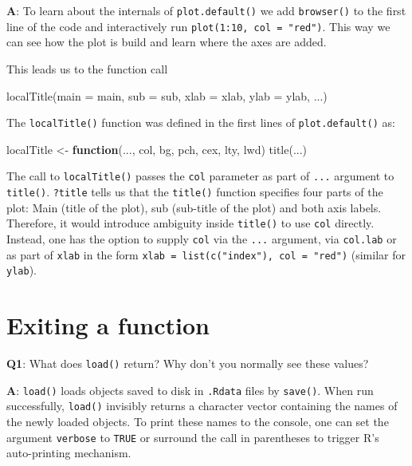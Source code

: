\documentclass[
]{krantz}
\makeatletter
\newenvironment{Shaded}{\begin{snugshade}}{\end{snugshade}}
\newcommand{\ControlFlowTok}[1]{\textcolor[rgb]{0.13,0.29,0.53}{\textbf{#1}}}
\newcommand{\DataTypeTok}[1]{\textcolor[rgb]{0.13,0.29,0.53}{#1}}
\newcommand{\KeywordTok}[1]{\textcolor[rgb]{0.13,0.29,0.53}{\textbf{#1}}}
\newcommand{\NormalTok}[1]{#1}
\newcommand{\StringTok}[1]{\textcolor[rgb]{0.31,0.60,0.02}{#1}}
\newenvironment{kframe}{%
\medskip{}
\setlength{\fboxsep}{.8em}
 \def\at@end@of@kframe{}%
 \ifinner\ifhmode%
  \def\at@end@of@kframe{\end{minipage}}%
  \begin{minipage}{\columnwidth}%
 \fi\fi%
 \def\FrameCommand##1{\hskip\@totalleftmargin \hskip-\fboxsep
 \colorbox{shadecolor}{##1}\hskip-\fboxsep
     \hskip-\linewidth \hskip-\@totalleftmargin \hskip\columnwidth}%
 \MakeFramed {\advance\hsize-\width
   \@totalleftmargin\z@ \linewidth\hsize
   \@setminipage}}%
 {\par\unskip\endMakeFramed%
 \at@end@of@kframe}
\renewenvironment{Shaded}{\begin{kframe}}{\end{kframe}}
\renewcommand{\KeywordTok} [1]{\textcolor[rgb]{0.00,0.44,0.13}{{#1}}}
\renewcommand{\DataTypeTok}[1]{\textcolor[rgb]{0.56,0.13,0.00}{{#1}}}
\renewcommand{\StringTok}  [1]{\textcolor[rgb]{0.25,0.44,0.63}{{#1}}}
\renewcommand{\NormalTok}  [1]{{#1}}
\makeatother
\begin{document}
\textbf{{A}}: To learn about the internals of \texttt{plot.default()} we add \texttt{browser()} to the first line of the code and interactively run \texttt{plot(1:10,\ col\ =\ "red")}. This way we can see how the plot is build and learn where the axes are added.

This leads us to the function call

\begin{Shaded}
\begin{Highlighting}[]
\KeywordTok{localTitle}\NormalTok{(}\DataTypeTok{main =}\NormalTok{ main, }\DataTypeTok{sub =}\NormalTok{ sub, }\DataTypeTok{xlab =}\NormalTok{ xlab, }\DataTypeTok{ylab =}\NormalTok{ ylab, ...)}
\end{Highlighting}
\end{Shaded}

The \texttt{localTitle()} function was defined in the first lines of \texttt{plot.default()} as:

\begin{Shaded}
\begin{Highlighting}[]
\NormalTok{localTitle <-}\StringTok{ }\ControlFlowTok{function}\NormalTok{(..., col, bg, pch, cex, lty, lwd) }\KeywordTok{title}\NormalTok{(...)}
\end{Highlighting}
\end{Shaded}

The call to \texttt{localTitle()} passes the \texttt{col} parameter as part of \texttt{...} argument to \texttt{title()}. \texttt{?title} tells us that the \texttt{title()} function specifies four parts of the plot: Main (title of the plot), sub (sub-title of the plot) and both axis labels. Therefore, it would introduce ambiguity inside \texttt{title()} to use \texttt{col} directly. Instead, one has the option to supply \texttt{col} via the \texttt{...} argument, via \texttt{col.lab} or as part of \texttt{xlab} in the form \texttt{xlab\ =\ list(c("index"),\ col\ =\ "red")} (similar for \texttt{ylab}).

\hypertarget{exiting-a-function}{%
\section{Exiting a function}\label{exiting-a-function}}

\textbf{{Q1}}: What does \texttt{load()} return? Why don't you normally see these values?

\textbf{{A}}: \texttt{load()} loads objects saved to disk in \texttt{.Rdata} files by \texttt{save()}. When run successfully, \texttt{load()} invisibly returns a character vector containing the names of the newly loaded objects. To print these names to the console, one can set the argument \texttt{verbose} to \texttt{TRUE} or surround the call in parentheses to trigger R's auto-printing mechanism.
\end{document}
